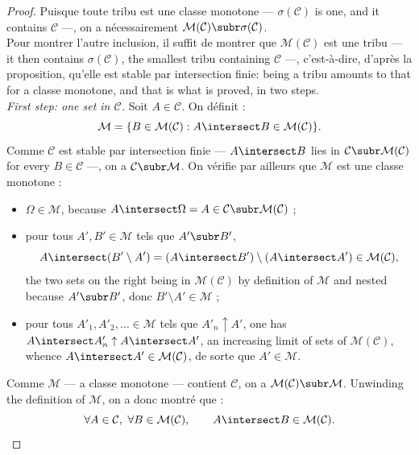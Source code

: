 \begin{proof}
  Puisque toute tribu est une classe monotone --- $\sigma(\mathcal{C})$ is one, and
  it contains $\mathcal{C}$ ---, on a nécessairement
  $\mathcal{M}(\mathcal{C}) \subr \sigma(\mathcal{C})$.\\
  Pour montrer l'autre inclusion, il suffit de montrer que $\mathcal{M}(\mathcal{C})$
  est une tribu --- it then contains $\sigma(\mathcal{C})$, the smallest tribu
  containing $\mathcal{C}$ ---, c'est-à-dire, d'après la proposition, qu'elle est
  stable par intersection finie: being a tribu amounts to that for a classe
  monotone, and that is what is proved, in two steps.\\
  \emph{First step: one set in $\mathcal{C}$.} Soit $A \in \mathcal{C}$. On
  définit :
  \[
    \mathcal{M} = \{B \in \mathcal{M}(\mathcal{C}) :
      A \intersect B \in \mathcal{M}(\mathcal{C})\}.
  \]
  Comme $\mathcal{C}$ est stable par intersection finie --- $A \intersect B$ lies
  in $\mathcal{C} \subr \mathcal{M}(\mathcal{C})$ for every $B \in \mathcal{C}$
  ---, on a $\mathcal{C} \subr \mathcal{M}$. On vérifie par ailleurs que
  $\mathcal{M}$ est une classe monotone :
  \begin{itemize}
    \item $\Omega \in \mathcal{M}$, because $A \intersect \Omega = A \in
      \mathcal{C} \subr \mathcal{M}(\mathcal{C})$ ;
    \item pour tous $A', B' \in \mathcal{M}$ tels que $A' \subr B'$,
      \[
        A \intersect (B' \setminus A')
          = (A \intersect B') \setminus (A \intersect A')
          \in \mathcal{M}(\mathcal{C}),
      \]
      the two sets on the right being in $\mathcal{M}(\mathcal{C})$ by definition of
      $\mathcal{M}$ and nested because $A' \subr B'$, donc
      $B' \setminus A' \in \mathcal{M}$ ;
    \item pour tous $A'_{1}, A'_{2}, \dots \in \mathcal{M}$ tels que
      $A'_{n} \uparrow A'$, one has $A \intersect A'_{n} \uparrow A \intersect A'$,
      an increasing limit of sets of $\mathcal{M}(\mathcal{C})$, whence
      $A \intersect A' \in \mathcal{M}(\mathcal{C})$, de sorte que
      $A' \in \mathcal{M}$.
  \end{itemize}
  Comme $\mathcal{M}$ --- a classe monotone --- contient $\mathcal{C}$, on a
  $\mathcal{M}(\mathcal{C}) \subr \mathcal{M}$. Unwinding the definition of
  $\mathcal{M}$, on a donc montré que :
  \[
    \forall A \in \mathcal{C}, \ \forall B \in \mathcal{M}(\mathcal{C}), \qquad
      A \intersect B \in \mathcal{M}(\mathcal{C}).
\]
\end{proof}

